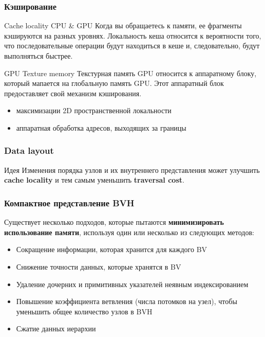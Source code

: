 \documentclass{beamer}
\begin{document}
\begin{frame}
    \frametitle{Кэширование}
    \begin{block}{Cache locality CPU \& GPU}
        Когда вы обращаетесь к памяти, ее фрагменты кэшируются на разных уровнях.
        Локальность кеша относится к вероятности того,
        что последовательные операции будут находиться в кеше и,
        следовательно, будут выполняться быстрее.
    \end{block}
    \begin{block}{GPU Texture memory}
        Текстурная память GPU относится к аппаратному блоку, который мапается на глобальную память GPU.
        Этот аппаратный блок предоставляет свой механизм кэширования.
        \begin{itemize}
            \item
                максимизации 2D пространственной локальности
            \item
                аппаратная обработка адресов, выходящих за границы
        \end{itemize}
    \end{block}
\end{frame}

\begin{frame}
    \frametitle{Data layout}
    \begin{block}{Идея}
        Изменения порядка узлов и их внутреннего представления может улучшить \textbf{cache locality}
        и тем самым уменьшить \textbf{traversal cost}.
    \end{block}
\end{frame}

\begin{frame}[t]
    \frametitle{Компактное представление BVH}
    Существует несколько подходов, которые пытаются \textbf{минимизировать использование памяти}, используя один или несколько из следующих методов:
    \begin{itemize}
        \item
            Сокращение информации, которая хранится для каждого BV
        \item
            Снижение точности данных, которые хранятся в BV
        \item
            Удаление дочерних и примитивных указателей неявным индексированием
        \item
            Повышение коэффициента ветвления (числа потомков на узел), чтобы уменьшить общее количество узлов в BVH
        \item
            Сжатие данных иерархии
    \end{itemize}

\end{frame}
\end{document}
